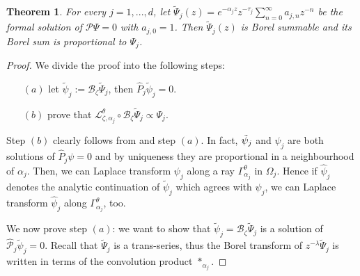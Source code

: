 \documentclass{article}
\theoremstyle{definition}
\newcommand{\series}[1]{\tilde{#1}}
\newcommand{\laplace}{\mathcal{L}}
\newcommand{\borel}{\mathcal{B}}
\theoremstyle{plain}
\newtheorem{theorem}{Theorem}[section]
\begin{document}
\begin{theorem}\label{thm2-dim}
For every $j=1,...,d$, let $\tilde{\Psi}_j(z)=e^{-\alpha_j z}z^{-\tau_j}\sum_{n=0}^{\infty}a_{j,n}z^{-n}$ be the formal solution of $\mathcal{P}\Psi=0$ with $a_{j,0}=1$. Then $\series{\Psi}_j(z)$ is Borel summable and its Borel sum is proportional to $\Psi_j$. 
\end{theorem}
\begin{proof}
We divide the proof into the following steps:
\begin{itemize}
\item[$(a)$] let $\series{\psi}_j:=\borel_{\zeta}\series{\Psi}_j$, then $\hat{P}_j\series{\psi}_j=0$.
\item[$(b)$] prove that $\laplace_{\zeta,\alpha_j}^{\theta}\circ\borel_\zeta\series{\Psi}_j\propto \Psi_j $. 
\end{itemize}

Step $(b)$ clearly follows from \cite[Theorem 4]{reg-sing-volterra} and step $(a)$. In fact, $\Tilde{\psi}_j$ and ${\psi}_j$ are both solutions of $\hat{P}_j\psi=0$ and by uniqueness they are proportional in a neighbourhood of $\alpha_j$. Then, we can Laplace transform ${\psi}_j$ along a ray $\Gamma_{\alpha_j}^\theta$ in $\Omega_j$. Hence if $\hat{\psi}_j$ denotes the analytic continuation of $\tilde{\psi}_j$ which agrees with $\psi_j$, we can Laplace transform $\hat{\psi}_j$ along $\Gamma_{\alpha_j}^\theta$, too. 

We now prove step $(a)$: we want to show that $\series{\psi}_j=\borel_{\zeta}\series{\Psi}_j$ is a solution of $\hat{\mathcal{P}}_j\series{\psi}_j=0$. Recall that $\tilde{\Psi}_j$ is a trans-series, thus the Borel transform of $z^{-\lambda}\tilde{\Psi}_j$ is written in terms of the convolution product $\ast_{\alpha_j}$.   




\end{proof}
\end{document}
